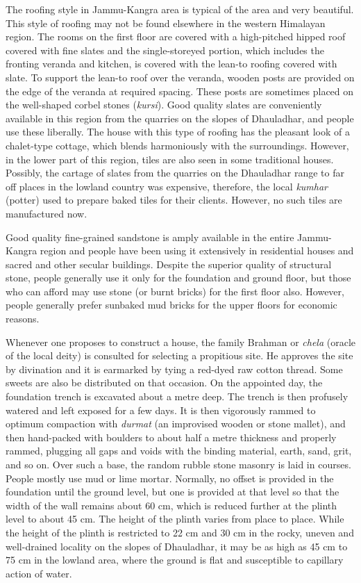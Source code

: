 The roofing style in Jammu-Kangra area is typical of the area and very beautiful. This style of roofing may not be found elsewhere in the western Himalayan region. The rooms on the first floor are covered with a high-pitched hipped roof covered with fine slates and the single-storeyed portion, which includes the fronting veranda and kitchen, is covered with the lean-to roofing covered with slate. To support the lean-to roof over the veranda, wooden posts are provided on the edge of the veranda at required spacing. These posts are sometimes placed on the well-shaped corbel stones (\textit{kursi}). Good quality slates are conveniently available in this region from the quarries on the slopes of Dhauladhar, and people use these liberally. The house with this type of roofing has the pleasant look of a chalet-type cottage, which blends harmoniously with the surroundings. However, in the lower part of this region, tiles are also seen in some traditional houses. Possibly, the cartage of slates from the quarries on the Dhauladhar range to far off places in the lowland country was expensive, therefore, the local \textit{kumhar} (potter) used to prepare baked tiles for their clients. However, no such tiles are manufactured now.

Good quality fine-grained sandstone is amply available in the entire Jammu-Kangra region and people have been using it extensively in residential houses and sacred and other secular buildings. Despite the superior quality of structural stone, people generally use it only for the foundation and ground floor, but those who can afford may use stone (or burnt bricks) for the first floor also. However, people generally prefer sunbaked mud bricks for the upper floors for economic reasons.

Whenever one proposes to construct a house, the family Brahman or \textit{chela} (oracle of the local deity) is consulted for selecting a propitious site. He approves the site by divination and it is earmarked by tying a red-dyed raw cotton thread. Some sweets are also be distributed on that occasion. On the appointed day, the foundation trench is excavated about a metre deep. The trench is then profusely watered and left exposed for a few days. It is then vigorously rammed to optimum compaction with \textit{durmat} (an improvised wooden or stone mallet), and then hand-packed with boulders to about half a metre thickness and properly rammed, plugging all gaps and voids with the binding material, earth, sand, grit, and so on. Over such a base, the random rubble stone masonry is laid in courses. People mostly use mud or lime mortar. Normally, no offset is provided in the foundation until the ground level, but one is provided at that level so that the width of the wall remains about 60 cm, which is reduced further at the plinth level to about 45 cm. The height of the plinth varies from place to place. While the height of the plinth is restricted to 22 cm and 30 cm in the rocky, uneven and well-drained locality on the slopes of Dhauladhar, it may be as high as 45 cm to 75 cm in the lowland area, where the ground is flat and susceptible to capillary action of water.

